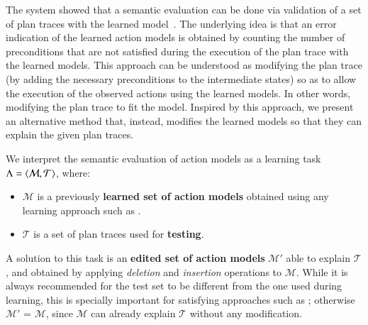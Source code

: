 
The \ARMS system showed that a semantic evaluation can be done via validation of a set of plan traces with the learned model~\cite{yang2007learning}. The underlying idea is that an error indication of the learned action models is obtained by counting the number of preconditions that are not satisfied during the execution of the plan trace with the learned models. This approach can be understood as modifying the plan trace (by adding the necessary preconditions to the intermediate states) so as to allow the execution of the observed actions using the learned models. In other words, modifying the plan trace to fit the model. Inspired by this approach, we present an alternative method that, instead, modifies the learned models so that they can explain the given plan traces.


\vspace{0.1cm}

We interpret the semantic evaluation of action models as a learning task $\Lambda = {\langle \mathcal{M}, \mathcal{T} \rangle}$, where:

\begin{itemize}
	\item $\mathcal{M}$ is a previously \textbf{learned set of action models} obtained using any learning approach such as \FAMA.
	
	\item$\mathcal{T}$ is a set of plan traces  used for \textbf{testing}.
\end{itemize}

A solution to this task is an \textbf{edited set of action models} $\mathcal{M'}$ able to explain $\mathcal{T}$, and obtained by applying \emph{deletion} and \emph{insertion} operations to $\mathcal{M}$. While it is always recommended for the test set to be different from the one used during learning, this is specially important for satisfying approaches such as \FAMA; otherwise $\mathcal{M'}$ = $\mathcal{M}$, since $\mathcal{M}$ can already explain $\mathcal{T}$ without any modification.

